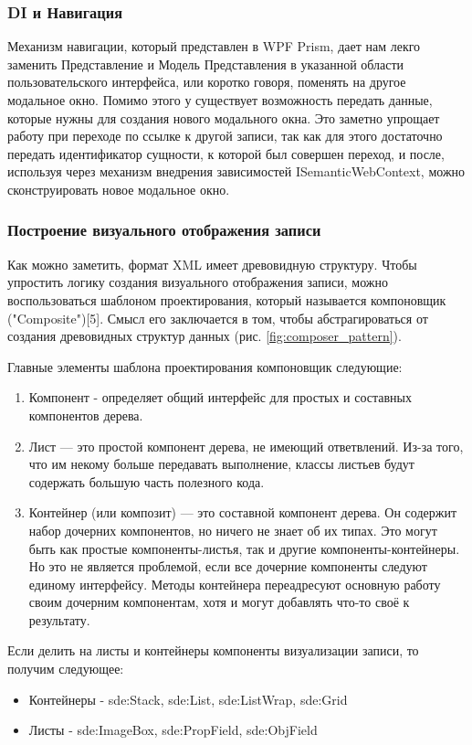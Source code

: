 \documentclass[12pt]{article}
\begin{document}
\subsubsection{DI и Навигация}
Механизм навигации, который представлен в WPF Prism, дает нам лекго заменить Представление и Модель Представления в указанной области пользовательского интерфейса, или коротко говоря, поменять на другое модальное окно. Помимо этого у существует возможность передать данные, которые нужны для создания нового модального окна. Это заметно упрощает работу при переходе по ссылке к другой записи, так как для этого достаточно передать идентификатор сущности, к которой был совершен переход, и после, используя через механизм внедрения зависимостей ISemanticWebContext, можно сконструировать новое модальное окно.

\subsubsection{Построение визуального отображения записи}
\qquad Как можно заметить, формат XML имеет древовидную структуру. Чтобы упростить логику создания визуального отображения записи, можно воспользоваться шаблоном проектирования, который называется компоновщик ("Composite")[5]. Смысл его заключается в том, чтобы абстрагироваться от создания древовидных структур данных (рис. \ref{fig:composer_pattern}).

Главные элементы шаблона проектирования компоновщик следующие:
\begin{enumerate}
    \item Компонент - определяет общий интерфейс для простых и составных компонентов дерева.
    \item Лист — это простой компонент дерева, не имеющий ответвлений. Из-за того, что им некому больше передавать выполнение, классы листьев будут содержать большую часть полезного кода.
    \item Контейнер (или композит) — это составной компонент дерева. Он содержит набор дочерних компонентов, но ничего не знает об их типах. Это могут быть как простые компоненты-листья, так и другие компоненты-контейнеры. Но это не является проблемой, если все дочерние компоненты следуют единому интерфейсу. Методы контейнера переадресуют основную работу своим дочерним компонентам, хотя и могут добавлять что-то своё к результату.
\end{enumerate}

Если делить на листы и контейнеры компоненты визуализации записи, то получим следующее:
\begin{itemize}
    \item Контейнеры - sde:Stack, sde:List, sde:ListWrap, sde:Grid
    \item Листы - sde:ImageBox, sde:PropField, sde:ObjField
\end{itemize}
\end{document}
